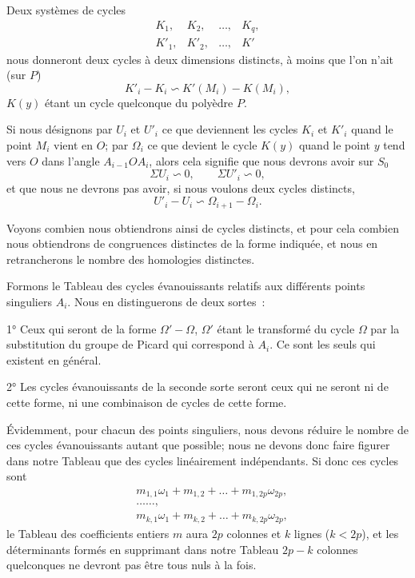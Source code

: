 \documentclass{article}
\begin{document}
Deux systèmes de cycles
\[ \begin{matrix} K_{1}, & K_{2}, & \ldots, & K_{q}, \\[1ex] K'_{1}, & K'_{2}, & \ldots, & K' \end{matrix} \]
nous donneront deux cycles à deux dimensions distincts, à moins que l'on n'ait (sur $P$)
\[ K'_{i} - K_{i} \backsim K'(M_{i}) - K(M_{i}), \]
$K(y)$ étant un cycle quelconque du polyèdre $P$.

Si nous désignons par $U_{i}$ et $U'_{i}$ ce que deviennent les cycles $K_{i}$ et $K'_{i}$ quand le point $M_{i}$ vient en $O$; par $\Omega_{i}$ ce que devient le cycle $K(y)$ quand le point $y$ tend vers $O$ dans l'angle $A_{i-1}OA_{i}$, alors cela signifie que nous devrons avoir sur $S_{0}$
\[ \Sigma U_{i} \backsim 0, \qquad \Sigma U'_{i} \backsim 0, \]
et que nous ne devrons pas avoir, si nous voulons deux cycles distincts,
\[ U'_{i} - U_{i} \backsim \Omega_{i+1} - \Omega_{i}. \]

Voyons combien nous obtiendrons ainsi de cycles distincts, et pour cela combien nous obtiendrons de congruences distinctes de la forme indiquée, et nous en retrancherons le nombre des homologies distinctes.


Formons le Tableau des cycles évanouissants relatifs aux différents points singuliers $A_{i}$. Nous en distinguerons de deux sortes~:

1° Ceux qui seront de la forme $\Omega' - \Omega$, $\Omega'$ étant le transformé du cycle $\Omega$ par la substitution du groupe de Picard qui correspond à $A_{i}$. Ce sont les seuls qui existent en général.

2° Les cycles évanouissants de la seconde sorte seront ceux qui ne seront ni de cette forme, ni une combinaison de cycles de cette forme.

Évidemment, pour chacun des points singuliers, nous devons réduire le nombre de ces cycles évanouissants autant que possible; nous ne devons donc faire figurer dans notre Tableau que des cycles linéairement indépendants. Si donc ces cycles sont
\[ \begin{aligned} &m_{1,1}\omega_{1} + m_{1,2} + \ldots + m_{1,2p}\omega_{2p},\\ &\ldots\ldots,\\ &m_{k,1}\omega_{1} + m_{k,2} + \ldots + m_{k,2p}\omega_{2p}, \end{aligned} \]
le Tableau des coefficients entiers $m$ aura $2p$ colonnes et $k$ lignes ($k < 2p$), et les déterminants formés en supprimant dans notre Tableau $2p - k$ colonnes quelconques ne devront pas être tous nuls à la fois.
\end{document}
